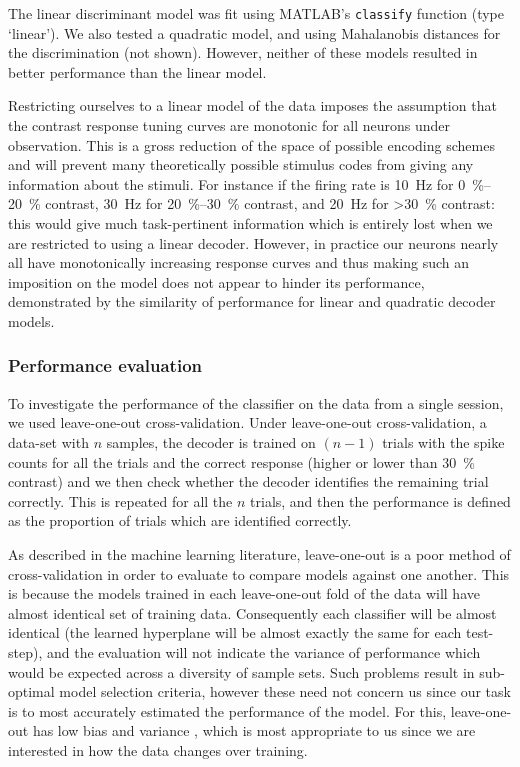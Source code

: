 The linear discriminant model was fit using MATLAB's \texttt{classify} function (type `linear').
We also tested a quadratic model, and using Mahalanobis distances for the discrimination (not shown).
However, neither of these models resulted in better performance than the linear model.

Restricting ourselves to a linear model of the data imposes the assumption that the contrast response tuning curves are monotonic for all neurons under observation.
This is a gross reduction of the space of possible encoding schemes and will prevent many theoretically possible stimulus codes from giving any information about the stimuli.
For instance if the firing rate is \SI{10}{Hz} for \SIrange{0}{20}{\percent} contrast, \SI{30}{Hz} for \SIrange{20}{30}{\percent} contrast, and \SI{20}{Hz} for \SI{>30}{\percent} contrast: this would give much task-pertinent information which is entirely lost when we are restricted to using a linear decoder.
However, in practice our neurons nearly all have monotonically increasing response curves and thus making such an imposition on the model does not appear to hinder its performance, demonstrated by the similarity of performance for linear and quadratic decoder models.


\subsubsection{Performance evaluation}

To investigate the performance of the classifier on the data from a single session, we used leave-one-out cross-validation.
Under leave-one-out cross-validation, a data-set with $n$ samples, the decoder is trained on $(n-1)$ trials with the spike counts for all the trials and the correct response (higher or lower than \SI{30}{\percent} contrast) and we then check whether the decoder identifies the remaining trial correctly.
This is repeated for all the $n$ trials, and then the performance is defined as the proportion of trials which are identified correctly.

As described in the machine learning literature, leave-one-out is a poor method of cross-validation in order to evaluate to compare models against one another.
This is because the models trained in each leave-one-out fold of the data will have almost identical set of training data.
Consequently each classifier will be almost identical (the learned hyperplane will be almost exactly the same for each test-step), and the evaluation will not indicate the variance of performance which would be expected across a diversity of sample sets.
Such problems result in sub-optimal model selection criteria, however these need not concern us since our task is to most accurately estimated the performance of the model.
For this, leave-one-out has low bias and variance \citep{Zhang2015}, which is most appropriate to us since we are interested in how the data changes over training.


